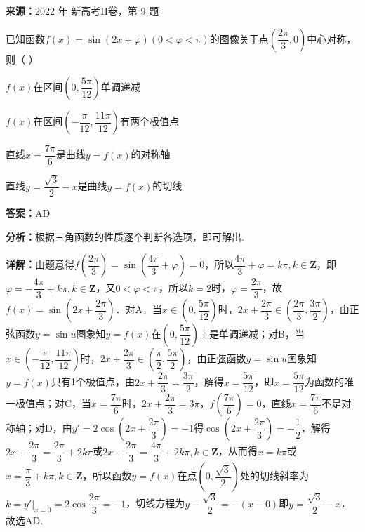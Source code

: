 \begin{question}[points=5]
\textbf{来源：}2022 年 新高考II卷，第 9 题\par
已知函数$f(x)=\sin(2x+\varphi)(0<\varphi<\pi)$的图像关于点$\left(\dfrac{2\pi}{3},0\right)$中心对称，则（ ）
\begin{choices}
  \item $f(x)$在区间$\left(0,\dfrac{5\pi}{12}\right)$单调递减
  \item $f(x)$在区间$\left(-\dfrac{\pi}{12},\dfrac{11\pi}{12}\right)$有两个极值点
  \item 直线$x=\dfrac{7\pi}{6}$是曲线$y=f(x)$的对称轴
  \item 直线$y=\dfrac{\sqrt{3}}{2}-x$是曲线$y=f(x)$的切线
\end{choices}
\begin{solution}
\textbf{答案：}AD

\textbf{分析：}根据三角函数的性质逐个判断各选项，即可解出.

\textbf{详解：}由题意得$f\left(\dfrac{2\pi}{3}\right)=\sin\left(\dfrac{4\pi}{3}+\varphi\right)=0$，所以$\dfrac{4\pi}{3}+\varphi=k\pi,k\in\mathbf{Z}$，即$\varphi=-\dfrac{4\pi}{3}+k\pi,k\in\mathbf{Z}$，又$0<\varphi<\pi$，所以$k=2$时，$\varphi=\dfrac{2\pi}{3}$，故$f(x)=\sin\left(2x+\dfrac{2\pi}{3}\right)$．对A，当$x\in\left(0,\dfrac{5\pi}{12}\right)$时，$2x+\dfrac{2\pi}{3}\in\left(\dfrac{2\pi}{3},\dfrac{3\pi}{2}\right)$，由正弦函数$y=\sin u$图象知$y=f(x)$在$\left(0,\dfrac{5\pi}{12}\right)$上是单调递减；对B，当$x\in\left(-\dfrac{\pi}{12},\dfrac{11\pi}{12}\right)$时，$2x+\dfrac{2\pi}{3}\in\left(\dfrac{\pi}{2},\dfrac{5\pi}{2}\right)$，由正弦函数$y=\sin u$图象知$y=f(x)$只有1个极值点，由$2x+\dfrac{2\pi}{3}=\dfrac{3\pi}{2}$，解得$x=\dfrac{5\pi}{12}$，即$x=\dfrac{5\pi}{12}$为函数的唯一极值点；对C，当$x=\dfrac{7\pi}{6}$时，$2x+\dfrac{2\pi}{3}=3\pi$，$f\left(\dfrac{7\pi}{6}\right)=0$，直线$x=\dfrac{7\pi}{6}$不是对称轴；对D，由$y'=2\cos\left(2x+\dfrac{2\pi}{3}\right)=-1$得$\cos\left(2x+\dfrac{2\pi}{3}\right)=-\dfrac{1}{2}$，解得$2x+\dfrac{2\pi}{3}=\dfrac{2\pi}{3}+2k\pi$或$2x+\dfrac{2\pi}{3}=\dfrac{4\pi}{3}+2k\pi,k\in\mathbf{Z}$，从而得$x=k\pi$或$x=\dfrac{\pi}{3}+k\pi,k\in\mathbf{Z}$，所以函数$y=f(x)$在点$\left(0,\dfrac{\sqrt{3}}{2}\right)$处的切线斜率为$k=y'|_{x=0}=2\cos\dfrac{2\pi}{3}=-1$，切线方程为$y-\dfrac{\sqrt{3}}{2}=-(x-0)$即$y=\dfrac{\sqrt{3}}{2}-x$．故选AD.
\end{solution}
\end{question}

